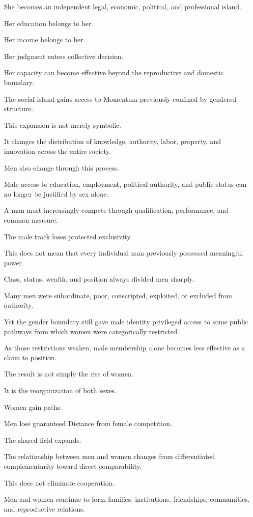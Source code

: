 She becomes an independent legal, economic, political, and professional island.

Her education belongs to her.

Her income belongs to her.

Her judgment enters collective decision.

Her capacity can become effective beyond the reproductive and domestic boundary.

The social island gains access to Momentum previously confined by gendered structure.

This expansion is not merely symbolic.

It changes the distribution of knowledge, authority, labor, property, and innovation across the entire society.

Men also change through this process.

Male access to education, employment, political authority, and public status can no longer be justified by sex alone.

A man must increasingly compete through qualification, performance, and common measure.

The male track loses protected exclusivity.

This does not mean that every individual man previously possessed meaningful power.

Class, status, wealth, and position always divided men sharply.

Many men were subordinate, poor, conscripted, exploited, or excluded from authority.

Yet the gender boundary still gave male identity privileged access to some public pathways from which women were categorically restricted.

As those restrictions weaken, male membership alone becomes less effective as a claim to position.

The result is not simply the rise of women.

It is the reorganization of both sexes.

Women gain paths.

Men lose guaranteed Distance from female competition.

The shared field expands.

The relationship between men and women changes from differentiated complementarity toward direct comparability.

This does not eliminate cooperation.

Men and women continue to form families, institutions, friendships, communities, and reproductive relations.

